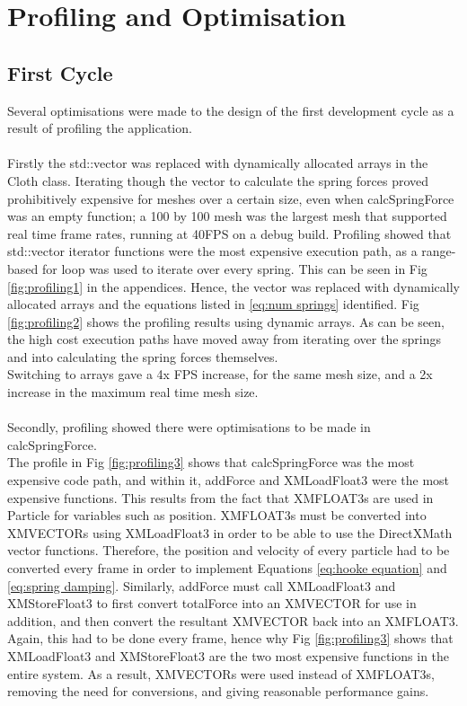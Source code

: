 \section{Profiling and Optimisation}
\label{sec:optimisation}

\subsection{First Cycle}
Several optimisations were made to the design of the first development cycle as a result of profiling the application.
\\\\Firstly the std::vector was replaced with dynamically allocated arrays in the Cloth class. Iterating though the vector to calculate the spring forces proved prohibitively expensive for meshes over a certain size, even when calcSpringForce was an empty function; a 100 by 100 mesh was the largest mesh that supported real time frame rates, running at 40FPS on a debug build. Profiling showed that std::vector iterator functions were the most expensive execution path, as a range-based for loop was used to iterate over every spring. This can be seen in Fig \ref{fig:profiling1} in the appendices. Hence, the vector was replaced with dynamically allocated arrays and the equations listed in \ref{eq:num springs} identified. Fig \ref{fig:profiling2} shows the profiling results using dynamic arrays. As can be seen, the high cost execution paths have moved away from iterating over the springs and into calculating the spring forces themselves.
\\Switching to arrays gave a 4x FPS increase, for the same mesh size, and a 2x increase in the maximum real time mesh size.
\\\\Secondly, profiling showed there were optimisations to be made in calcSpringForce.
\\The profile in Fig \ref{fig:profiling3} shows that calcSpringForce was the most expensive code path, and within it, addForce and XMLoadFloat3 were the most expensive functions. This results from the fact that XMFLOAT3s are used in Particle for variables such as position. XMFLOAT3s must be converted into XMVECTORs using XMLoadFloat3 in order to be able to use the DirectXMath vector functions. Therefore, the position and velocity of every particle had to be converted every frame in order to implement Equations \ref{eq:hooke equation} and \ref{eq:spring damping}. Similarly, addForce must call XMLoadFloat3 and XMStoreFloat3 to first convert totalForce into an XMVECTOR for use in addition, and then convert the resultant XMVECTOR back into an XMFLOAT3. Again, this had to be done every frame, hence why Fig \ref{fig:profiling3} shows that XMLoadFloat3 and XMStoreFloat3 are the two most expensive functions in the entire system. As a result, XMVECTORs were used instead of XMFLOAT3s, removing the need for conversions, and giving reasonable performance gains.

